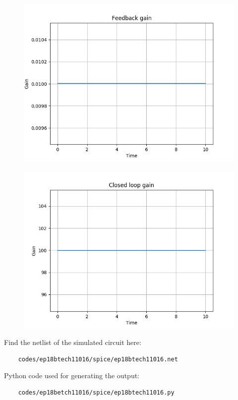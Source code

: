 \begin{enumerate}[label=\arabic*.,ref=\theenumi]
\renewcommand{\thefigure}{\theenumi.\arabic{figure}}
\begin{figure}[!ht]
    \centering
    \includegraphics[width=\columnwidth]{./figs/ep18btech11016/ep18btech11016_feed_gain}
\caption{}
\label{fig:ep18btech11016_feed_gain}
\end{figure}

\begin{figure}[!ht]
	\centering
    \includegraphics[width=\columnwidth]{./figs/ep18btech11016/ep18btech11016_cl_gain}
\caption{}
\label{fig:ep18btech11016_cl_gin}
\end{figure}
\renewcommand{\thefigure}{\theenumi}

Find the netlist of the simulated circuit here:
\begin{lstlisting}
    codes/ep18btech11016/spice/ep18btech11016.net
\end{lstlisting}

Python code used for generating the output:
\begin{lstlisting}
    codes/ep18betch11016/spice/ep18btech11016.py
\end{lstlisting}


\end{enumerate}
